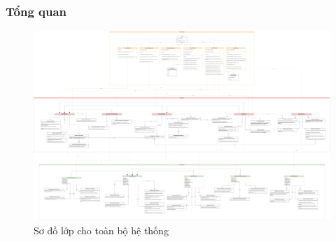 \subsubsection{Tổng quan}
\begin{figure}[H]
    \centering
    \includegraphics[width=\linewidth]{Content/Phân tích và thiết kế hệ thống/documents/Sơ đồ lớp/images/LayerArchitect.png}
    \vspace{0.5cm}
    \caption{Sơ đồ lớp cho toàn bộ hệ thống}
    \label{fig:Sơ đồ lớp cho toàn bộ hệ thống}
\end{figure}